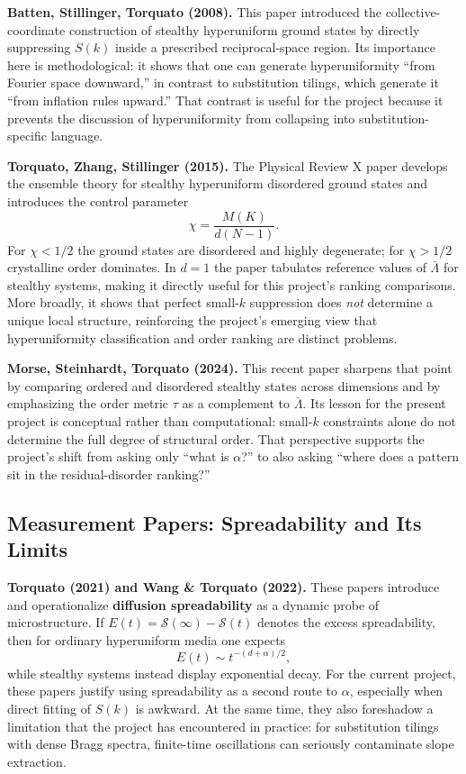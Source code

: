 \documentclass[11pt,letterpaper]{article}
\begin{document}
\vspace{0.4em}
\noindent\textbf{Batten, Stillinger, Torquato (2008).}
This paper introduced the collective-coordinate construction of stealthy hyperuniform
ground states by directly suppressing $S(k)$ inside a prescribed reciprocal-space region.
Its importance here is methodological: it shows that one can generate hyperuniformity
``from Fourier space downward,'' in contrast to substitution tilings, which generate it
``from inflation rules upward.''
That contrast is useful for the project because it prevents the discussion of
hyperuniformity from collapsing into substitution-specific language.

\vspace{0.4em}
\noindent\textbf{Torquato, Zhang, Stillinger (2015).}
The Physical Review X paper develops the ensemble theory for stealthy hyperuniform
disordered ground states and introduces the control parameter
\[
  \chi = \frac{M(K)}{d(N-1)}.
\]
For $\chi < 1/2$ the ground states are disordered and highly degenerate; for
$\chi > 1/2$ crystalline order dominates.
In $d=1$ the paper tabulates reference values of $\bar\Lambda$ for stealthy systems,
making it directly useful for this project's ranking comparisons.
More broadly, it shows that perfect small-$k$ suppression does \emph{not} determine a
unique local structure, reinforcing the project's emerging view that hyperuniformity
classification and order ranking are distinct problems.

\vspace{0.4em}
\noindent\textbf{Morse, Steinhardt, Torquato (2024).}
This recent paper sharpens that point by comparing ordered and disordered stealthy states
across dimensions and by emphasizing the order metric $\tau$ as a complement to
$\bar\Lambda$.
Its lesson for the present project is conceptual rather than computational:
small-$k$ constraints alone do not determine the full degree of structural order.
That perspective supports the project's shift from asking only ``what is $\alpha$?''
to also asking ``where does a pattern sit in the residual-disorder ranking?''

\subsection{Measurement Papers: Spreadability and Its Limits}

\noindent\textbf{Torquato (2021) and Wang \& Torquato (2022).}
These papers introduce and operationalize \textbf{diffusion spreadability} as a dynamic
probe of microstructure.
If $E(t) = \mathcal{S}(\infty) - \mathcal{S}(t)$ denotes the excess spreadability, then
for ordinary hyperuniform media one expects
\[
  E(t) \sim t^{-(d+\alpha)/2},
\]
while stealthy systems instead display exponential decay.
For the current project, these papers justify using spreadability as a second route to
$\alpha$, especially when direct fitting of $S(k)$ is awkward.
At the same time, they also foreshadow a limitation that the project has encountered in
practice: for substitution tilings with dense Bragg spectra, finite-time oscillations can
seriously contaminate slope extraction.
\end{document}
